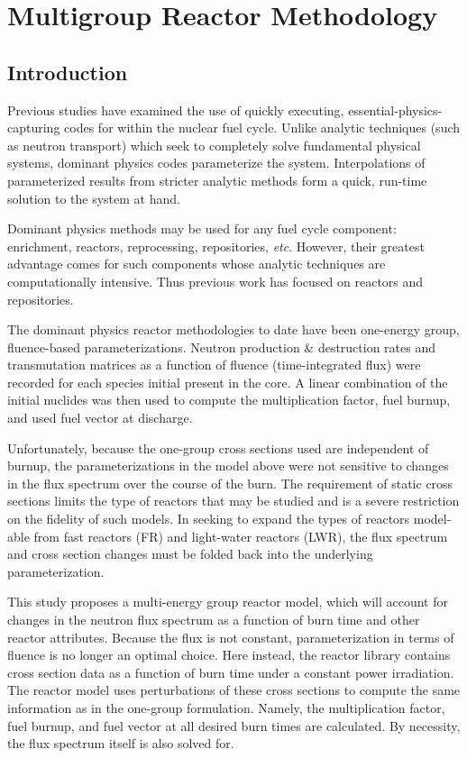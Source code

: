 \chapter{Multigroup Reactor Methodology}
\label{mg_paper}

\section{Introduction}
\label{mg_sec:intro}
Previous studies have examined the use of quickly executing, essential-physics-capturing codes for within the
nuclear fuel cycle.  Unlike analytic techniques (such as neutron transport) which seek to completely 
solve fundamental physical systems, dominant physics codes parameterize the system.   Interpolations
of parameterized results from stricter analytic methods form a quick, run-time solution to the system at hand.

Dominant physics methods may be used for any fuel cycle component: enrichment, reactors, reprocessing, 
repositories, \emph{etc}.  However, their greatest advantage comes for such components whose analytic
techniques are computationally intensive.  Thus previous work has focused on reactors and repositories.

The dominant physics reactor methodologies to date have been one-energy group, fluence-based parameterizations.
Neutron production \& destruction rates and transmutation matrices as a function of fluence 
(time-integrated flux) were recorded for each species initial present in the core.  A linear combination of 
the initial nuclides was then used to compute the multiplication factor, fuel burnup, and used fuel 
vector at discharge.

Unfortunately, because the one-group cross sections used are independent of burnup,
the parameterizations in the model above were not sensitive to changes in the flux spectrum over the 
course of the burn.  The requirement of static cross sections limits the type of reactors that may be 
studied and is a severe restriction on the fidelity of such models.  In seeking to expand the types of 
reactors model-able from fast reactors (FR) and light-water reactors (LWR), the flux spectrum and 
cross section changes must be folded back into the underlying parameterization.

This study proposes a multi-energy group reactor model, which will account for changes in the neutron
flux spectrum as a function of burn time and other reactor attributes.  Because the flux is not constant, 
parameterization in terms of fluence is no longer an optimal choice.  Here instead, the reactor library 
contains cross section data as a function of burn time under a constant power irradiation.  The reactor model 
uses perturbations of these cross sections to compute the same information as in the one-group 
formulation.  Namely, the multiplication factor, fuel burnup, and fuel vector at all desired burn times
are calculated.  By necessity, the flux spectrum itself is also solved for.

